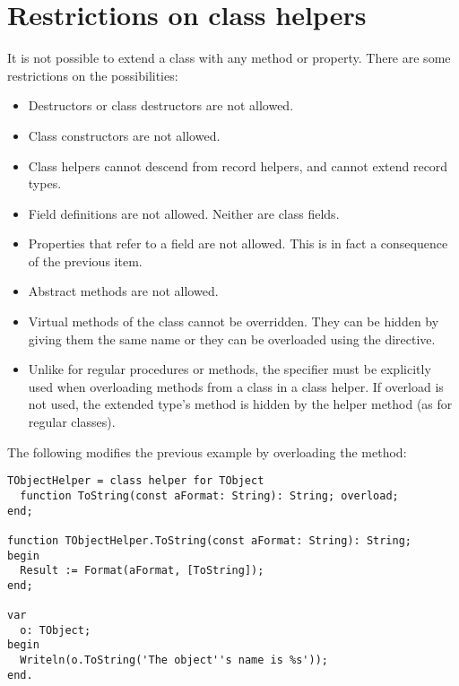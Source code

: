 \section{Restrictions on class helpers}
It is not possible to extend a class with any method or property. There are
some restrictions on the possibilities:
\begin{itemize}
\item Destructors or class destructors are not allowed.
\item Class constructors are not allowed.
\item Class helpers cannot descend from record helpers, and cannot extend record types.
\item Field definitions are not allowed. Neither are class fields.
\item Properties that refer to a field are not allowed. This is in fact a
consequence of the previous item.
\item Abstract methods are not allowed.
\item Virtual methods of the class cannot be overridden. They can be hidden
by giving them the same name or they can be overloaded using the
 directive.
\item Unlike for regular procedures or methods, the  specifier must
be explicitly used when overloading methods from a class in a class helper.
If overload is not used, the extended type's method is hidden by the helper method
(as for regular classes).
\end{itemize}
The following modifies the previous example by overloading the 
method:
\begin{verbatim}
TObjectHelper = class helper for TObject
  function ToString(const aFormat: String): String; overload;
end;

function TObjectHelper.ToString(const aFormat: String): String;
begin
  Result := Format(aFormat, [ToString]);
end;

var
  o: TObject;
begin
  Writeln(o.ToString('The object''s name is %s'));
end.
\end{verbatim}

